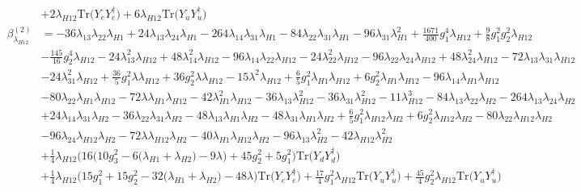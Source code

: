 {\begin{align}
 &+2 \lambda_{H12} \mbox{Tr}\Big({Y_e  Y_{e}^{\dagger}}\Big) +6 \lambda_{H12} \mbox{Tr}\Big({Y_u  Y_{u}^{\dagger}}\Big) \\ 
\beta_{\lambda_{H12}}^{(2)} & =  
-36 \lambda_{13} \lambda_{22} \lambda_{H1} +24 \lambda_{13} \lambda_{24} \lambda_{H1} -264 \lambda_{14} \lambda_{31} \lambda_{H1} -84 \lambda_{22} \lambda_{31} \lambda_{H1} -96 \lambda_{31} \lambda_{H1}^{2} +\frac{1671}{400} g_{1}^{4} \lambda_{H12} +\frac{9}{8} g_{1}^{2} g_{2}^{2} \lambda_{H12} \nonumber \\ 
 &-\frac{145}{16} g_{2}^{4} \lambda_{H12} -24 \lambda_{13}^{2} \lambda_{H12} +48 \lambda_{14}^{2} \lambda_{H12} -96 \lambda_{14} \lambda_{22} \lambda_{H12} -24 \lambda_{22}^{2} \lambda_{H12} -96 \lambda_{22} \lambda_{24} \lambda_{H12} +48 \lambda_{24}^{2} \lambda_{H12} -72 \lambda_{13} \lambda_{31} \lambda_{H12} \nonumber \\ 
 &-24 \lambda_{31}^{2} \lambda_{H12} +\frac{36}{5} g_{1}^{2} \lambda \lambda_{H12} +36 g_{2}^{2} \lambda \lambda_{H12} -15 \lambda^{2} \lambda_{H12} +\frac{6}{5} g_{1}^{2} \lambda_{H1} \lambda_{H12} +6 g_{2}^{2} \lambda_{H1} \lambda_{H12} -96 \lambda_{14} \lambda_{H1} \lambda_{H12} \nonumber \\ 
 &-80 \lambda_{22} \lambda_{H1} \lambda_{H12} -72 \lambda \lambda_{H1} \lambda_{H12} -42 \lambda_{H1}^{2} \lambda_{H12} -36 \lambda_{13} \lambda_{H12}^{2} -36 \lambda_{31} \lambda_{H12}^{2} -11 \lambda_{H12}^{3} -84 \lambda_{13} \lambda_{22} \lambda_{H2} -264 \lambda_{13} \lambda_{24} \lambda_{H2} \nonumber \\ 
 &+24 \lambda_{14} \lambda_{31} \lambda_{H2} -36 \lambda_{22} \lambda_{31} \lambda_{H2} -48 \lambda_{13} \lambda_{H1} \lambda_{H2} -48 \lambda_{31} \lambda_{H1} \lambda_{H2} +\frac{6}{5} g_{1}^{2} \lambda_{H12} \lambda_{H2} +6 g_{2}^{2} \lambda_{H12} \lambda_{H2} -80 \lambda_{22} \lambda_{H12} \lambda_{H2} \nonumber \\ 
 &-96 \lambda_{24} \lambda_{H12} \lambda_{H2} -72 \lambda \lambda_{H12} \lambda_{H2} -40 \lambda_{H1} \lambda_{H12} \lambda_{H2} -96 \lambda_{13} \lambda_{H2}^{2} -42 \lambda_{H12} \lambda_{H2}^{2} \nonumber \\ 
 &+\frac{1}{4} \lambda_{H12} \Big(16 \Big(10 g_{3}^{2}  -6 \Big(\lambda_{H1} + \lambda_{H2}\Big) -9 \lambda \Big) + 45 g_{2}^{2}  + 5 g_{1}^{2} \Big)\mbox{Tr}\Big({Y_d  Y_{d}^{\dagger}}\Big) \nonumber \\ 
 &+\frac{1}{4} \lambda_{H12} \Big(15 g_{1}^{2}  + 15 g_{2}^{2}  -32 \Big(\lambda_{H1} + \lambda_{H2}\Big) -48 \lambda \Big)\mbox{Tr}\Big({Y_e  Y_{e}^{\dagger}}\Big) +\frac{17}{4} g_{1}^{2} \lambda_{H12} \mbox{Tr}\Big({Y_u  Y_{u}^{\dagger}}\Big) +\frac{45}{4} g_{2}^{2} \lambda_{H12} \mbox{Tr}\Big({Y_u  Y_{u}^{\dagger}}\Big) \nonumber \\ 

\end{align}}
